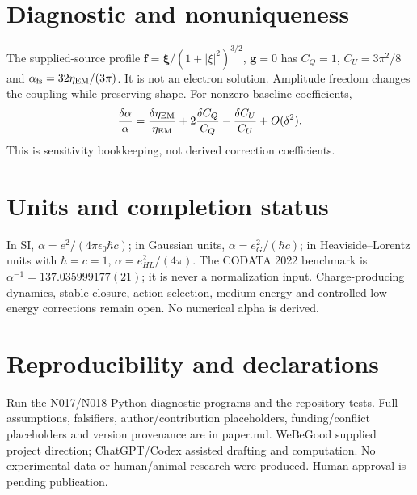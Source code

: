 \documentclass[11pt]{article}
\begin{document}
\section{Diagnostic and nonuniqueness}
The supplied-source profile $\mathbf f=\boldsymbol\xi/(1+|\xi|^2)^{3/2}$,
$\mathbf g=0$ has $C_Q=1$, $C_U=3\pi^2/8$ and
$\alpha_{\rm fs}=32\eta_{\rm EM}/(3\pi)$. It is not an electron solution.
Amplitude freedom changes the coupling while preserving shape.
For nonzero baseline coefficients,
\begin{equation}
\frac{\delta\alpha}{\alpha}=\frac{\delta\eta_{\rm EM}}{\eta_{\rm EM}}
+2\frac{\delta C_Q}{C_Q}-\frac{\delta C_U}{C_U}+O(\delta^2).
\end{equation}
This is sensitivity bookkeeping, not derived correction coefficients.
\section{Units and completion status}
In SI, $\alpha=e^2/(4\pi\epsilon_0\hbar c)$; in Gaussian units,
$\alpha=e_G^2/(\hbar c)$; in Heaviside--Lorentz units with $\hbar=c=1$,
$\alpha=e_{HL}^2/(4\pi)$. The CODATA 2022 benchmark is
$\alpha^{-1}=137.035999177(21)$\cite{nist}; it is never a normalization input.
Charge-producing dynamics, stable closure, action selection, medium energy and
controlled low-energy corrections remain open. No numerical alpha is derived.
\section{Reproducibility and declarations}
Run the N017/N018 Python diagnostic programs and the repository tests. Full
assumptions, falsifiers, author/contribution placeholders, funding/conflict
placeholders and version provenance are in paper.md. WeBeGood supplied project
direction; ChatGPT/Codex assisted drafting and computation. No experimental data
or human/animal research were produced. Human approval is pending publication.

\end{document}
